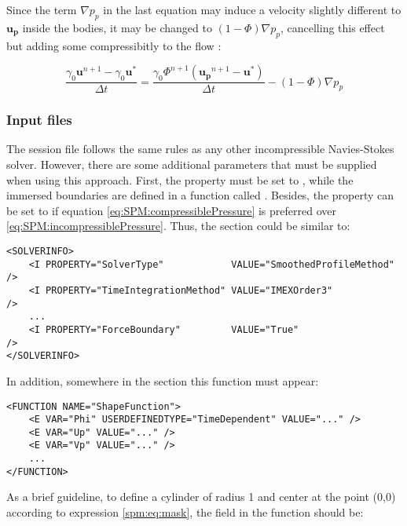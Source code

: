 Since the term $\nabla p_p$ in the last equation may induce a velocity slightly
different to $\mathbf{u_p}$ inside the bodies, it may be changed to
$(1-\Phi)\nabla p_p$, cancelling this effect but adding some compressibitly to
the flow \cite{LuoSPM}:

\begin{equation} \label{eq:SPM:compressiblePressure}
    \frac{\gamma_0\mathbf{u}^{n+1}-\gamma_0\mathbf{u^*}}{\Delta t} =
        \frac{\gamma_0\Phi^{n+1}(\mathbf{u_p}^{n+1}-\mathbf{u^*})}{\Delta t} -
        (1-\Phi) \nabla p_p
\end{equation}

\subsubsection{Input files}

The session file follows the same rules as any other incompressible
Navies-Stokes solver. However, there are some additional parameters that must
be supplied when using this approach. First, the property 
must be set to , while the immersed boundaries are
defined in a function called . Besides, the property
 can be set to  if equation
\eqref{eq:SPM:compressiblePressure} is preferred over
\eqref{eq:SPM:incompressiblePressure}. Thus, the  section
could be similar to:

\begin{lstlisting}[style=XMLStyle]
<SOLVERINFO>
    <I PROPERTY="SolverType"            VALUE="SmoothedProfileMethod" />
    <I PROPERTY="TimeIntegrationMethod" VALUE="IMEXOrder3"            />
    ...
    <I PROPERTY="ForceBoundary"         VALUE="True"                  />
</SOLVERINFO>
\end{lstlisting}

In addition, somewhere in the  section this function must
appear:

\begin{lstlisting}[style=XMLStyle]
<FUNCTION NAME="ShapeFunction">
    <E VAR="Phi" USERDEFINEDTYPE="TimeDependent" VALUE="..." />
    <E VAR="Up" VALUE="..." />
    <E VAR="Vp" VALUE="..." />
    ...
</FUNCTION>
\end{lstlisting}

As a brief guideline, to define a cylinder of radius 1 and center at the point
(0,0) according to expression \eqref{spm:eq:mask}, the  field in
the  function should be:

